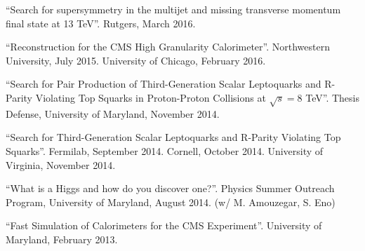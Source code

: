 \begin{description}[leftmargin=12pt,font=\normalfont,labelsep=0em]
\item ``Search for supersymmetry in the multijet and missing transverse momentum final state at 13 TeV''. Rutgers, March 2016.
\item ``Reconstruction for the CMS High Granularity Calorimeter''. Northwestern University, July 2015. University of Chicago, February 2016.
\item ``Search for Pair Production of Third-Generation Scalar Leptoquarks and R-Parity Violating Top Squarks in Proton-Proton Collisions at $\sqrt{s}=8$ TeV''. Thesis Defense, University of Maryland, November 2014.
\item ``Search for Third-Generation Scalar Leptoquarks and R-Parity Violating Top Squarks''. Fermilab, September 2014. Cornell, October 2014. University of Virginia, November 2014.
\item ``What is a Higgs and how do you discover one?''. Physics Summer Outreach Program, University of Maryland, August 2014. (w/ M. Amouzegar, S. Eno)
\item ``Fast Simulation of Calorimeters for the CMS Experiment''. University of Maryland, February 2013.
\end{description}

\ifdefined\longflag
